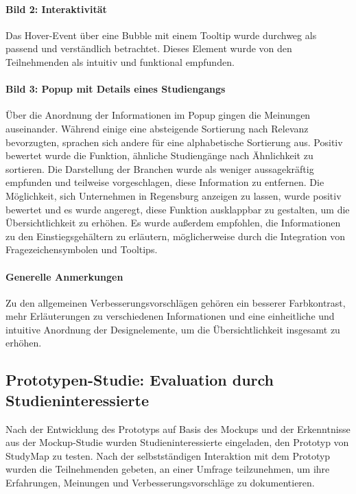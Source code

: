 \paragraph{Bild 2: Interaktivität}
Das Hover-Event über eine Bubble mit einem Tooltip wurde durchweg als passend und verständlich betrachtet. Dieses Element wurde von den Teilnehmenden als intuitiv und funktional empfunden.

\paragraph{Bild 3: Popup mit Details eines Studiengangs}
Über die Anordnung der Informationen im Popup gingen die Meinungen auseinander. Während einige eine absteigende Sortierung nach Relevanz bevorzugten, sprachen sich andere für eine alphabetische Sortierung aus. Positiv bewertet wurde die Funktion, ähnliche Studiengänge nach Ähnlichkeit zu sortieren. Die Darstellung der Branchen wurde als weniger aussagekräftig empfunden und teilweise vorgeschlagen, diese Information zu entfernen. Die Möglichkeit, sich Unternehmen in Regensburg anzeigen zu lassen, wurde positiv bewertet und es wurde angeregt, diese Funktion ausklappbar zu gestalten, um die Übersichtlichkeit zu erhöhen. Es wurde außerdem empfohlen, die Informationen zu den Einstiegsgehältern zu erläutern, möglicherweise durch die Integration von Fragezeichensymbolen und Tooltips.

\paragraph{Generelle Anmerkungen}
Zu den allgemeinen Verbesserungsvorschlägen gehören ein besserer Farbkontrast, mehr Erläuterungen zu verschiedenen Informationen und eine einheitliche und intuitive Anordnung der Designelemente, um die Übersichtlichkeit insgesamt zu erhöhen.

%
%
%
%
%
%
\subsection{Prototypen-Studie: Evaluation durch Studieninteressierte}
Nach der Entwicklung des Prototyps auf Basis des Mockups und der Erkenntnisse aus der Mockup-Studie wurden Studieninteressierte eingeladen, den Prototyp von StudyMap zu testen. Nach der selbstständigen Interaktion mit dem Prototyp wurden die Teilnehmenden gebeten, an einer Umfrage teilzunehmen, um ihre Erfahrungen, Meinungen und Verbesserungsvorschläge zu dokumentieren.

